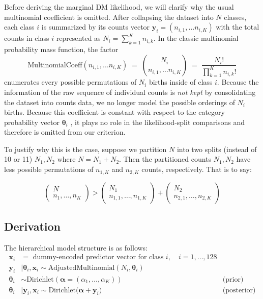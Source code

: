 Before deriving the marginal DM likelihood, we will clarify why the usual multinomial coefficient is omitted. After collapsing the dataset into \(N\)  classes, each class \(i\) is summarized by its counts vector \(\mathbf{y}_i = (n_{i,1}, \dots n_{i,K})\) with the total counts in class \(i\) represented as \(N_i = \sum_{k=1}^K n_{i,k}\). In the classic multinomial probability mass function, the factor 
\begin{equation*}
    \label{eq:multinomial-coef}
    \mathrm{MultinomialCoeff}(n_{i,1}, \dots n_{i,K})
  \;=\;
        \binom{N_i}{n_{i,1}, \dots n_{i,K}}
 \;=\; 
        \frac{N_i!}{\prod_{k=1}^K n_{i,k}!}
\end{equation*} 
enumerates every possible permutations of \(N_i\) births inside of class \(i\). Because the information of the raw sequence of individual counts is \emph{not kept} by consolidating the dataset into counts data, we no longer model the possible orderings of \(N_i\) births. Because this coefficient is constant with respect to the category probability vector \(\boldsymbol{\theta}_i\) \parencite{wiki:dirichlet-multinomial}, it plays no role in the likelihood-split comparisons and therefore is omitted from our criterion.

To justify why this is the case, suppose we partition \(N\) into two splits (instead of 10 or 11) \(N_1, N_2\) where \(N = N_1 + N_2\). Then the partitioned counts \(N_1,N_2\) have less possible permutations of \(n_{1,K}\) and \(n_{2,K}\) counts, respectively. That is to say: 


\[
     \begin{pmatrix}
         N \\ n_1, \dots, n_K
     \end{pmatrix}
     >
     \begin{pmatrix}
         N_1 \\ n_{1,1}, \dots, n_{1,K}
     \end{pmatrix}
     +
     \begin{pmatrix}
         N_2 \\ n_{2,1}, \dots, n_{2,K}
     \end{pmatrix}
\]


\subsection{Derivation}
\label{sec:ch2-likelihood-derivation}

The hierarchical model structure is as follows: 
\begin{align*}
    \mathbf{x}_i &=\text{ dummy-encoded predictor vector for class } i, \quad i = 1,\dots,128 \\
    \mathbf{y}_i &\mid \boldsymbol{\theta}_i, \mathbf{x}_i \sim \mathrm{AdjustedMultinomial}\left(N_i, \boldsymbol{\theta}_i\right)\\
    \boldsymbol{\theta}_i  &\sim \mathrm{Dirichlet}\left(\boldsymbol{\alpha}= (\alpha_1, \dots, \alpha_K)\right) \quad  & \text{(prior)}\\
    \boldsymbol{\theta}_i &\mid \mathbf{y}_i, \mathbf{x}_i \sim \mathrm{Dirichlet}\bigl(\boldsymbol{\alpha} + \mathbf{y}_i \bigr) \quad & \text{(posterior)}
\end{align*}


